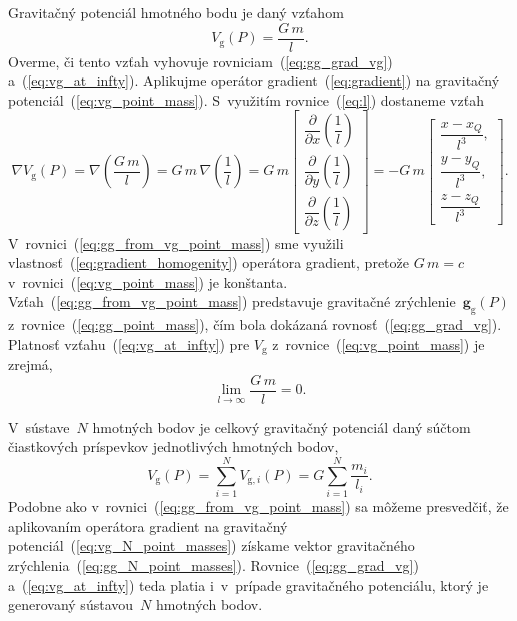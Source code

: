 \documentclass[a4paper,12pt]{book}
\newcommand{\gidx}{\mathrm g}
\let\vec\mathbf
\begin{document}
Gravitačný potenciál hmotného bodu je daný vzťahom
%
\begin{equation}
\label{eq:vg_point_mass}
V_\gidx(P) = \frac{G \, m}{l}{.}
\end{equation}
%
Overme, či tento vzťah vyhovuje rovniciam~(\ref{eq:gg_grad_vg})
a~(\ref{eq:vg_at_infty}).  Aplikujme operátor gradient~(\ref{eq:gradient})
na gravitačný potenciál~(\ref{eq:vg_point_mass}).  S~využitím 
rovnice~(\ref{eq:l}) dostaneme vzťah
%
\begin{equation}
\label{eq:gg_from_vg_point_mass}
\nabla V_\gidx(P) = \nabla \left( \frac{G \, m}{l} \right) = G \, m \, \nabla 
\left( \frac{1}{l} \right) =
%
G \, m
\begin{bmatrix}
\dfrac{\partial}{\partial x} \left( \dfrac{1}{l} \right)\\[2ex]
\dfrac{\partial}{\partial y} \left( \dfrac{1}{l} \right)\\[2ex]
\dfrac{\partial}{\partial z} \left( \dfrac{1}{l} \right)
\end{bmatrix}
%
=
%
-G \, m
%
\begin{bmatrix}
\dfrac{x - x_Q}{l^3}{,}\\[2ex]
\dfrac{y - y_Q}{l^3}{,}\\[2ex]
\dfrac{z - z_Q}{l^3}
\end{bmatrix}
{.}
\end{equation}
%
V~rovnici~(\ref{eq:gg_from_vg_point_mass}) sme využili 
vlastnosť~(\ref{eq:gradient_homogenity}) operátora gradient, pretože $G \, 
m = c$ v~rovnici~(\ref{eq:vg_point_mass}) je konštanta.  
Vzťah~(\ref{eq:gg_from_vg_point_mass}) predstavuje gravitačné zrýchlenie~$\vec 
g_\gidx(P)$ z~rovnice~(\ref{eq:gg_point_mass}), čím bola dokázaná 
rovnosť~(\ref{eq:gg_grad_vg}).  Platnosť vzťahu~(\ref{eq:vg_at_infty}) pre 
$V_\gidx$ z~rovnice~(\ref{eq:vg_point_mass}) je zrejmá,
%
\begin{equation}
\lim_{l \to \infty} \frac{G \, m}{l} = 0{.}
\end{equation}

V~sústave~$N$ hmotných bodov je celkový gravitačný potenciál daný súčtom
čiastkových príspevkov jednotlivých hmotných bodov,
%
\begin{equation}
\label{eq:vg_N_point_masses}
V_\gidx(P) = \sum_{i = 1}^{N} V_{\gidx,i}(P) = G \sum_{i = 1}^{N}\frac{
m_i}{l_i}{.}
\end{equation}
%
Podobne ako v~rovnici~(\ref{eq:gg_from_vg_point_mass}) sa môžeme presvedčiť, že 
aplikovaním operátora gradient na gravitačný
potenciál~(\ref{eq:vg_N_point_masses}) získame vektor gravitačného
zrýchlenia~(\ref{eq:gg_N_point_masses}).  Rovnice~(\ref{eq:gg_grad_vg}) 
a~(\ref{eq:vg_at_infty}) teda platia i~v~prípade gravitačného
potenciálu, ktorý je generovaný sústavou~$N$ hmotných bodov.
\end{document}
